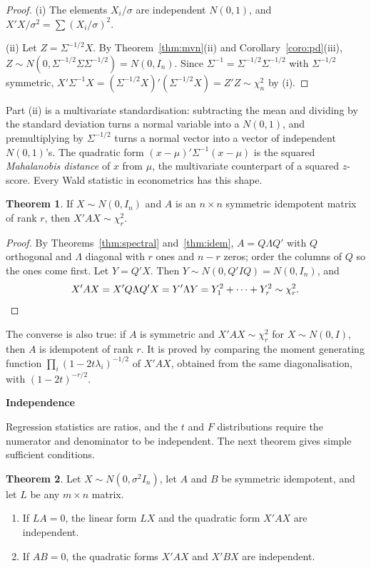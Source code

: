 \documentclass[11pt,a4paper]{article}
\numberwithin{equation}{section}
\theoremstyle{definition}
\newtheorem{thm}{Theorem}[subsection]
\newcommand{\subhead}[1]{%
  \par\medskip\noindent\textbf{#1}\par\nobreak\smallskip}
\begin{document}
\begin{proof}
(i) The elements $X_i/\sigma$ are independent $N(0, 1)$, and $X'X/\sigma^2 = \sum (X_i/\sigma)^2$.

(ii) Let $Z = \Sigma^{-1/2}X$. By Theorem~\ref{thm:mvn}(ii) and Corollary~\ref{coro:pd}(iii), $Z \sim N(0, \Sigma^{-1/2}\Sigma\Sigma^{-1/2}) = N(0, I_n)$. Since
$\Sigma^{-1} = \Sigma^{-1/2}\Sigma^{-1/2}$ with $\Sigma^{-1/2}$ symmetric, $X'\Sigma^{-1}X = (\Sigma^{-1/2}X)'(\Sigma^{-1/2}X) = Z'Z \sim \chi^2_n$ by (i).
\end{proof}

Part (ii) is a multivariate standardisation: subtracting the mean and dividing by the standard deviation turns a normal variable into a
$N(0, 1)$, and premultiplying by $\Sigma^{-1/2}$ turns a normal vector into a vector of independent $N(0, 1)$'s. The quadratic form
$(x - \mu)'\Sigma^{-1}(x - \mu)$ is the squared \emph{Mahalanobis distance} of $x$ from $\mu$, the multivariate counterpart of a squared $z$-score. Every
Wald statistic in econometrics has this shape.

\begin{thm}
\label{thm:qf2}
If $X \sim N(0, I_n)$ and $A$ is an $n \times n$ symmetric idempotent matrix of rank $r$, then $X'AX \sim \chi^2_r$.
\end{thm}

\begin{proof}
By Theorems~\ref{thm:spectral} and~\ref{thm:idem}, $A = Q\Lambda Q'$ with $Q$ orthogonal and $\Lambda$ diagonal with $r$ ones and $n - r$ zeros; order
the columns of $Q$ so the ones come first. Let $Y = Q'X$. Then $Y \sim N(0, Q'IQ) = N(0, I_n)$, and
\[
X'AX = X'Q\Lambda Q'X = Y'\Lambda Y = Y_1^2 + \dots + Y_r^2 \sim \chi^2_r . \qedhere
\]
\end{proof}

The converse is also true: if $A$ is symmetric and $X'AX \sim \chi^2_r$ for $X \sim N(0, I)$, then $A$ is idempotent of rank $r$. It is proved by
comparing the moment generating function $\prod_i(1 - 2t\lambda_i)^{-1/2}$ of $X'AX$, obtained from the same diagonalisation, with $(1 - 2t)^{-r/2}$.

\subhead{Independence}
Regression statistics are ratios, and the $t$ and $F$ distributions require the numerator and denominator to be independent. The next theorem
gives simple sufficient conditions.

\begin{thm}
\label{thm:indep}
Let $X \sim N(0, \sigma^2I_n)$, let $A$ and $B$ be symmetric idempotent, and let $L$ be any $m \times n$ matrix.
\begin{enumerate}[label=(\roman*)]
\item If $LA = 0$, the linear form $LX$ and the quadratic form $X'AX$ are independent.
\item If $AB = 0$, the quadratic forms $X'AX$ and $X'BX$ are independent.
\end{enumerate}
\end{thm}
\end{document}
